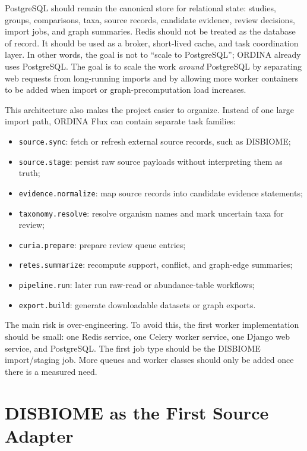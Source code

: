 \documentclass[11pt,a4paper]{article}
\begin{document}
PostgreSQL should remain the canonical store for relational state: studies, groups, comparisons, taxa, source records, candidate evidence, review decisions, import jobs, and graph summaries. Redis should not be treated as the database of record. It should be used as a broker, short-lived cache, and task coordination layer. In other words, the goal is not to ``scale to PostgreSQL''; ORDINA already uses PostgreSQL. The goal is to scale the work \emph{around} PostgreSQL by separating web requests from long-running imports and by allowing more worker containers to be added when import or graph-precomputation load increases.

This architecture also makes the project easier to organize. Instead of one large import path, ORDINA Flux can contain separate task families:

\begin{itemize}[noitemsep]
    \item \texttt{source.sync}: fetch or refresh external source records, such as DISBIOME;
    \item \texttt{source.stage}: persist raw source payloads without interpreting them as truth;
    \item \texttt{evidence.normalize}: map source records into candidate evidence statements;
    \item \texttt{taxonomy.resolve}: resolve organism names and mark uncertain taxa for review;
    \item \texttt{curia.prepare}: prepare review queue entries;
    \item \texttt{retes.summarize}: recompute support, conflict, and graph-edge summaries;
    \item \texttt{pipeline.run}: later run raw-read or abundance-table workflows;
    \item \texttt{export.build}: generate downloadable datasets or graph exports.
\end{itemize}

The main risk is over-engineering. To avoid this, the first worker implementation should be small: one Redis service, one Celery worker service, one Django web service, and PostgreSQL. The first job type should be the DISBIOME import/staging job. More queues and worker classes should only be added once there is a measured need.

\section{DISBIOME as the First Source Adapter}
\end{document}
